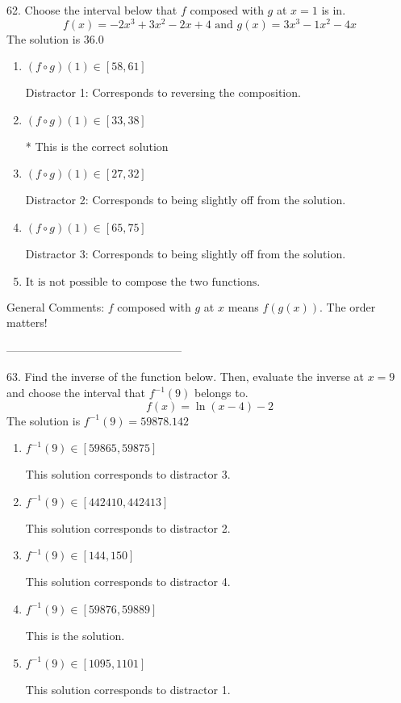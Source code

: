 \documentclass{extbook}[14pt]
\begin{document}
62. Choose the interval below that $f$ composed with $g$ at $x=1$ is in.
\[ f(x) = -2x^{3} +3 x^{2} -2 x + 4 \text{ and } g(x) = 3x^{3} -1 x^{2} -4 x \] 
The solution is $ 36.0 $ 

\begin{enumerate}[label=\Alph*.] 
\item $ (f \circ g)(1) \in [58, 61] $ 

  Distractor 1: Corresponds to reversing the composition. 
\item $ (f \circ g)(1) \in [33, 38] $ 

 * This is the correct solution 
\item $ (f \circ g)(1) \in [27, 32] $ 

  Distractor 2: Corresponds to being slightly off from the solution. 
\item $ (f \circ g)(1) \in [65, 75] $ 

  Distractor 3: Corresponds to being slightly off from the solution. 
\item $ \text{It is not possible to compose the two functions.} $ 

  
\end{enumerate} 
 
General Comments: $f$ composed with $g$ at $x$ means $f(g(x))$. The order matters!

-----------------------------------------------

63. Find the inverse of the function below. Then, evaluate the inverse at $x = 9$ and choose the interval that $f^{-1}(9)$ belongs to.
\[ f(x) = \ln{(x-4)}-2 \] 
The solution is $ f^{-1}(9) = 59878.142 $ 

\begin{enumerate}[label=\Alph*.] 
\item $ f^{-1}(9) \in [59865, 59875] $ 

  This solution corresponds to distractor 3. 
\item $ f^{-1}(9) \in [442410, 442413] $ 

  This solution corresponds to distractor 2. 
\item $ f^{-1}(9) \in [144, 150] $ 

  This solution corresponds to distractor 4. 
\item $ f^{-1}(9) \in [59876, 59889] $ 

  This is the solution. 
\item $ f^{-1}(9) \in [1095, 1101] $ 

  This solution corresponds to distractor 1. 
\end{enumerate} 
 
\end{document}
